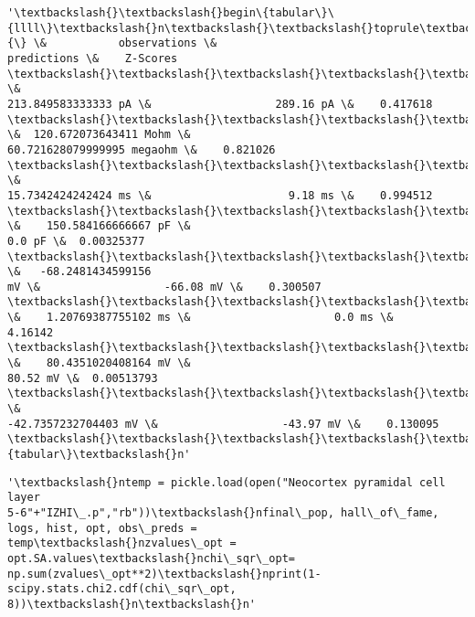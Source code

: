 \documentclass[11pt]{article}
\begin{document}
            \begin{tcolorbox}[breakable, size=fbox, boxrule=.5pt, pad at break*=1mm, opacityfill=0]
\begin{Verbatim}[commandchars=\\\{\}]
'\textbackslash{}\textbackslash{}begin\{tabular\}\{llll\}\textbackslash{}n\textbackslash{}\textbackslash{}toprule\textbackslash{}n\{\} \&           observations \&
predictions \&    Z-Scores \textbackslash{}\textbackslash{}\textbackslash{}\textbackslash{}\textbackslash{}n\textbackslash{}\textbackslash{}midrule\textbackslash{}nRheobaseTest                   \&
213.849583333333 pA \&                   289.16 pA \&    0.417618
\textbackslash{}\textbackslash{}\textbackslash{}\textbackslash{}\textbackslash{}nInputResistanceTest            \&  120.672073643411 Mohm \&
60.721628079999995 megaohm \&    0.821026 \textbackslash{}\textbackslash{}\textbackslash{}\textbackslash{}\textbackslash{}nTimeConstantTest               \&
15.7342424242424 ms \&                     9.18 ms \&    0.994512
\textbackslash{}\textbackslash{}\textbackslash{}\textbackslash{}\textbackslash{}nCapacitanceTest                \&    150.584166666667 pF \&
0.0 pF \&  0.00325377 \textbackslash{}\textbackslash{}\textbackslash{}\textbackslash{}\textbackslash{}nRestingPotentialTest           \&   -68.2481434599156
mV \&                   -66.08 mV \&    0.300507 \textbackslash{}\textbackslash{}\textbackslash{}\textbackslash{}\textbackslash{}nInjectedCurrentAPWidthTest
\&    1.20769387755102 ms \&                      0.0 ms \&     4.16142
\textbackslash{}\textbackslash{}\textbackslash{}\textbackslash{}\textbackslash{}nInjectedCurrentAPAmplitudeTest \&    80.4351020408164 mV \&
80.52 mV \&  0.00513793 \textbackslash{}\textbackslash{}\textbackslash{}\textbackslash{}\textbackslash{}nInjectedCurrentAPThresholdTest \&
-42.7357232704403 mV \&                   -43.97 mV \&    0.130095
\textbackslash{}\textbackslash{}\textbackslash{}\textbackslash{}\textbackslash{}n\textbackslash{}\textbackslash{}bottomrule\textbackslash{}n\textbackslash{}\textbackslash{}end\{tabular\}\textbackslash{}n'
\end{Verbatim}
\end{tcolorbox}
        
            \begin{tcolorbox}[breakable, size=fbox, boxrule=.5pt, pad at break*=1mm, opacityfill=0]
\begin{Verbatim}[commandchars=\\\{\}]
'\textbackslash{}ntemp = pickle.load(open("Neocortex pyramidal cell layer
5-6"+"IZHI\_.p","rb"))\textbackslash{}nfinal\_pop, hall\_of\_fame, logs, hist, opt, obs\_preds =
temp\textbackslash{}nzvalues\_opt = opt.SA.values\textbackslash{}nchi\_sqr\_opt=
np.sum(zvalues\_opt**2)\textbackslash{}nprint(1-scipy.stats.chi2.cdf(chi\_sqr\_opt, 8))\textbackslash{}n\textbackslash{}n'
\end{Verbatim}
\end{tcolorbox}
        
\end{document}
